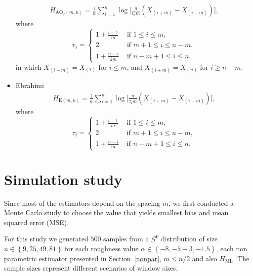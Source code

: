 \documentclass[journal]{IEEEtran}
\begin{document}
\begin{itemize}
	\label{MH}
	\begin{align}
		H_{\text{AO}_2(m,n)}=\frac{1}{n} \sum_{i=1}^{n} \log \Big[\frac{n}{v_{i} m}\left(X_{(i+m)}-X_{(i-m)}\right)\Big],
	\end{align}
	where
	\begin{equation*}
		v_{i}=\begin{cases}
			1+\frac{i-1}{m} & \text{ if }1 \leq i \leq m, \\
			2 & \text{ if } m+1 \leq i \leq n-m, \\
			1+\frac{n-i}{2 m} & \text{ if } n-m+1 \leq i \leq n,
		\end{cases}
	\end{equation*}
	in which $X_{(i-m)}=X_{(1)}$ for $i \leq m$, and $X_{(i+m)}=X_{(n)}$ for $i \geq n-m$.
	\item Ebrahimi~\cite{Ebrahimi94}
	\begin{align}
	H_{\text{E}(m,n)}=\frac{1}{n} \sum_{i=1}^{n} \log \Big[\frac{n}{\tau_{i} m}\left(X_{(i+m)}-X_{(i-m)}\right)\Big],
		\label{HE}
	\end{align}
	where
	\begin{equation*}
	\tau_{i}=\begin{cases}
		1+\frac{i-1}{m} & \text{ if }1 \leq i \leq m, \\
		2 & \text{ if } m+1 \leq i \leq n-m, \\
		1+\frac{n-i}{m} & \text{ if } n-m+1 \leq i \leq n.
			\end{cases}
	\end{equation*}
\end{itemize}

\section{Simulation study}\label{simulation}

Since most of the estimators depend on the spacing $m$, we first conducted a Monte Carlo study  to choose the value that yields smallest bias and mean squared error (MSE). %

For this study we generated $500$ samples from a $\mathcal{G}^0$ distribution of size $n \in\left\lbrace 9,25,49,81\right\rbrace $ for each roughness value $\alpha \in\left\lbrace -8,-5-3,-1.5\right\rbrace $, each non parametric estimator presented in Section~\ref{nonpar}, $m \leq {n}/{2}$ and also $H_{\text{ML}}$. 
The sample sizes represent different scenarios of window sizes. 
\end{document}
